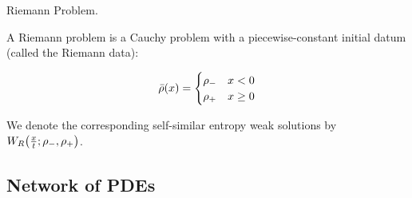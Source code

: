 %
%
%
%
%
\begin{defn}
\label{def:Riemann-Problem}Riemann Problem.

A Riemann problem is a Cauchy problem with a piecewise-constant initial datum (called the Riemann data):

\[
\bar{\rho}(x)=\begin{cases}
\rho_{-} & x<0\\
\rho_{+} & x\ge 0
\end{cases}
\]
\end{defn}
We denote the corresponding self-similar entropy weak solutions by $\ss{\frac{x}{t}}{\cvar_{-}}{\cvar_{+}}$.


\subsection{Network of PDEs\label{sub:Network-of-PDE's}}

